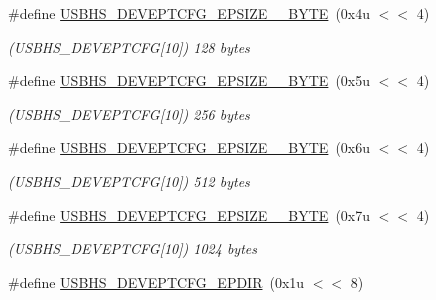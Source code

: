 \begin{DoxyCompactItemize}
\#define \mbox{\hyperlink{group__SAME70__USBHS_gaada6b4c339fd81152ebf6b88657ce678}{U\+S\+B\+H\+S\+\_\+\+D\+E\+V\+E\+P\+T\+C\+F\+G\+\_\+\+E\+P\+S\+I\+Z\+E\+\_\+\_\+\+B\+Y\+TE}}~(0x4u $<$$<$ 4)
\begin{DoxyCompactList}\small\item\em (U\+S\+B\+H\+S\+\_\+\+D\+E\+V\+E\+P\+T\+C\+FG\mbox{[}10\mbox{]}) 128 bytes \end{DoxyCompactList}\item 
\mbox{\label{group__SAME70__USBHS_ga65463bfd966add42c50286017402b044}} 
\#define \mbox{\hyperlink{group__SAME70__USBHS_ga65463bfd966add42c50286017402b044}{U\+S\+B\+H\+S\+\_\+\+D\+E\+V\+E\+P\+T\+C\+F\+G\+\_\+\+E\+P\+S\+I\+Z\+E\+\_\+\_\+\+B\+Y\+TE}}~(0x5u $<$$<$ 4)
\begin{DoxyCompactList}\small\item\em (U\+S\+B\+H\+S\+\_\+\+D\+E\+V\+E\+P\+T\+C\+FG\mbox{[}10\mbox{]}) 256 bytes \end{DoxyCompactList}\item 
\mbox{\label{group__SAME70__USBHS_ga2d333b468cf7268f13cf096b3fab2467}} 
\#define \mbox{\hyperlink{group__SAME70__USBHS_ga2d333b468cf7268f13cf096b3fab2467}{U\+S\+B\+H\+S\+\_\+\+D\+E\+V\+E\+P\+T\+C\+F\+G\+\_\+\+E\+P\+S\+I\+Z\+E\+\_\+\_\+\+B\+Y\+TE}}~(0x6u $<$$<$ 4)
\begin{DoxyCompactList}\small\item\em (U\+S\+B\+H\+S\+\_\+\+D\+E\+V\+E\+P\+T\+C\+FG\mbox{[}10\mbox{]}) 512 bytes \end{DoxyCompactList}\item 
\mbox{\label{group__SAME70__USBHS_ga22733ae82f074ec9b79dc1d573ada90d}} 
\#define \mbox{\hyperlink{group__SAME70__USBHS_ga22733ae82f074ec9b79dc1d573ada90d}{U\+S\+B\+H\+S\+\_\+\+D\+E\+V\+E\+P\+T\+C\+F\+G\+\_\+\+E\+P\+S\+I\+Z\+E\+\_\+\_\+\+B\+Y\+TE}}~(0x7u $<$$<$ 4)
\begin{DoxyCompactList}\small\item\em (U\+S\+B\+H\+S\+\_\+\+D\+E\+V\+E\+P\+T\+C\+FG\mbox{[}10\mbox{]}) 1024 bytes \end{DoxyCompactList}\item 
\mbox{\label{group__SAME70__USBHS_ga0ecea3cab7098eb72284e7764de66b99}} 
\#define \mbox{\hyperlink{group__SAME70__USBHS_ga0ecea3cab7098eb72284e7764de66b99}{U\+S\+B\+H\+S\+\_\+\+D\+E\+V\+E\+P\+T\+C\+F\+G\+\_\+\+E\+P\+D\+IR}}~(0x1u $<$$<$ 8)
$$
\end{DoxyCompactItemize}

